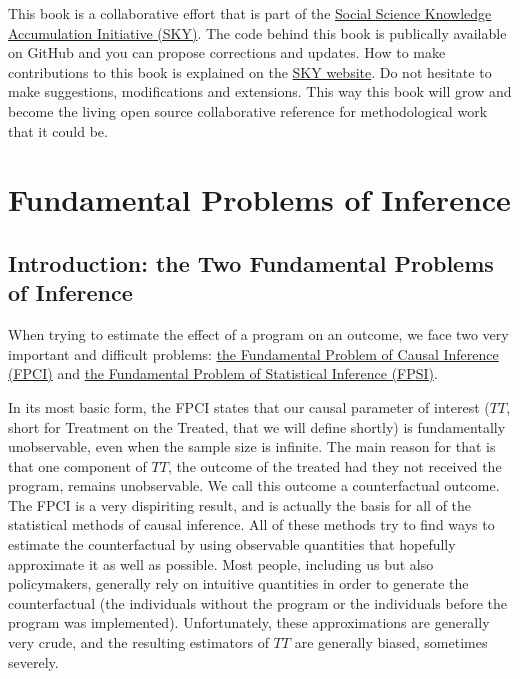 \documentclass[]{book}
\theoremstyle{definition}
\theoremstyle{definition}
\theoremstyle{definition}
\theoremstyle{remark}
\begin{document}
This book is a collaborative effort that is part of the
\href{https://chabefer.github.io/SKY/}{Social Science Knowledge
Accumulation Initiative (SKY)}. The code behind this book is publically
available on GitHub and you can propose corrections and updates. How to
make contributions to this book is explained on the
\href{https://chabefer.github.io/SKY/tutoSTCI.html}{SKY website}. Do not
hesitate to make suggestions, modifications and extensions. This way
this book will grow and become the living open source collaborative
reference for methodological work that it could be.

\part{Fundamental Problems of
Inference}\label{part-fundamental-problems-of-inference}

\chapter*{Introduction: the Two Fundamental Problems of
Inference}\label{introduction-the-two-fundamental-problems-of-inference}

When trying to estimate the effect of a program on an outcome, we face
two very important and difficult problems: \href{FPCI.html}{the
Fundamental Problem of Causal Inference (FPCI)} and \href{FPSI.html}{the
Fundamental Problem of Statistical Inference (FPSI)}.

In its most basic form, the FPCI states that our causal parameter of
interest (\(TT\), short for Treatment on the Treated, that we will
define shortly) is fundamentally unobservable, even when the sample size
is infinite. The main reason for that is that one component of \(TT\),
the outcome of the treated had they not received the program, remains
unobservable. We call this outcome a counterfactual outcome. The FPCI is
a very dispiriting result, and is actually the basis for all of the
statistical methods of causal inference. All of these methods try to
find ways to estimate the counterfactual by using observable quantities
that hopefully approximate it as well as possible. Most people,
including us but also policymakers, generally rely on intuitive
quantities in order to generate the counterfactual (the individuals
without the program or the individuals before the program was
implemented). Unfortunately, these approximations are generally very
crude, and the resulting estimators of \(TT\) are generally biased,
sometimes severely.
\end{document}
